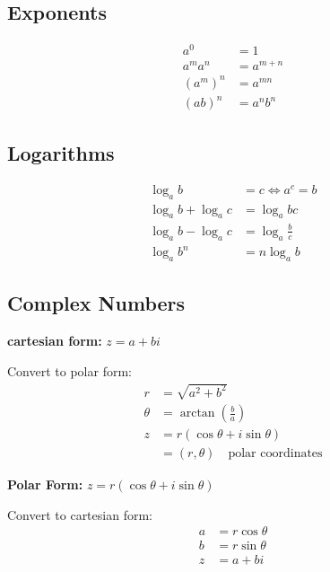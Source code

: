 \documentclass[12pt]{article}
\begin{document}
\vspace{1cm}

\noindent
\begin{minipage}[t]{0.45\textwidth}
  \subsection*{Exponents}
  \begin{align}
    a^0 &= 1 \\
    a^m a^n &= a^{m+n} \\
    (a^m)^n &= a^{mn} \\
    (ab)^n &= a^n b^n
  \end{align}
\end{minipage}%
\hfill
\begin{minipage}[t]{0.45\textwidth}
  \subsection*{Logarithms}
  \begin{align}
    \log_a b &= c \iff a^c = b \\
    \log_a b + \log_a c &= \log_a bc \\
    \log_a b - \log_a c &= \log_a \frac{b}{c} \\
    \log_a b^n &= n \log_a b
  \end{align}
\end{minipage}


\subsection*{Complex Numbers}

\noindent
\begin{minipage}[t]{0.45\textwidth}
\textbf{cartesian form:} $z = a + bi$
\vspace{0.5cm}

Convert to polar form:
\begin{align}
  r &= \sqrt{a^2 + b^2} \\
  \theta &= \arctan \left( \frac{b}{a} \right) \\
  z &= r(\cos \theta + i \sin \theta) \\
    &= (r, \theta) \quad \text{polar coordinates}
\end{align}
\end{minipage}%
\hfill
\begin{minipage}[t]{0.45\textwidth}
\textbf{Polar Form:} $z = r(\cos \theta + i \sin \theta)$
\vspace{0.5cm}

Convert to cartesian form:
\begin{align}
  a &= r \cos \theta \\
  b &= r \sin \theta \\
  z &= a + bi
\end{align}
\end{minipage}
\vspace{0.5cm}
\end{document}
